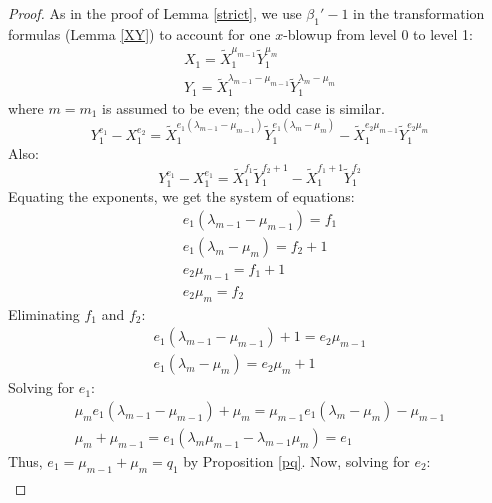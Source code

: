 \documentclass[11pt]{amsart}
\theoremstyle{definition}
\begin{document}
{\begin{proof}
As in the proof of Lemma \ref{strict}, we use $\beta_1'-1$ in the transformation formulas (Lemma \ref{XY}) to account for one $x$-blowup from level 0 to level 1:
\begin{equation*}
\begin{array}{l}
X_1 = \tilde X_1^{\mu_{m-1}}\tilde Y_1^{\mu_m} \\
Y_1 = \tilde X_1^{\lambda_{m-1}-\mu_{m-1}}\tilde Y_1^{\lambda_m-\mu_m}
\end{array}
\end{equation*}
where $m=m_1$ is assumed to be even; the odd case is similar.
\begin{equation*}
Y_1^{e_1}-X_1^{e_2}=\tilde X_1^{e_1(\lambda_{m-1}-\mu_{m-1})}\tilde Y_1^{e_1(\lambda_m-\mu_m)} - \tilde X_1^{e_2\mu_{m-1}}\tilde Y_1^{e_2\mu_m}
\end{equation*}
Also:
\begin{equation*}
Y_1^{e_1}-X_1^{e_1} = \tilde X_1^{f_1}\tilde Y_1^{f_2+1} - \tilde X_1^{f_1+1}\tilde Y_1^{f_2}
\end{equation*}
Equating the exponents, we get the system of equations:
\begin{equation*}
\begin{array}{l}
e_1(\lambda_{m-1}-\mu_{m-1}) = f_1 \\
e_1(\lambda_m-\mu_m) = f_2+1 \\
e_2\mu_{m-1} = f_1+1 \\
e_2\mu_m = f_2
\end{array}
\end{equation*}
Eliminating $f_1$ and $f_2$:
\begin{equation*}
\begin{array}{l}
e_1(\lambda_{m-1}-\mu_{m-1}) +1 = e_2\mu_{m-1} \\
e_1(\lambda_m-\mu_m) = e_2\mu_m +1
\end{array}
\end{equation*}
Solving for $e_1$:
\begin{equation*}
\begin{array}{l}
\mu_m e_1(\lambda_{m-1}-\mu_{m-1}) +\mu_m = \mu_{m-1}e_1(\lambda_m-\mu_m) -\mu_{m-1} \\
\mu_{m}+\mu_{m-1} = e_1(\lambda_m \mu_{m-1}-\lambda_{m-1}\mu_m) = e_1
\end{array}
\end{equation*}
Thus, $e_1=\mu_{m-1}+\mu_m=q_1$ by Proposition \ref{pq}. Now, solving for $e_2$:
\begin{equation*}
\begin{array}{rl}

\end{array}
\end{equation*}
\end{proof}}
\end{document}
